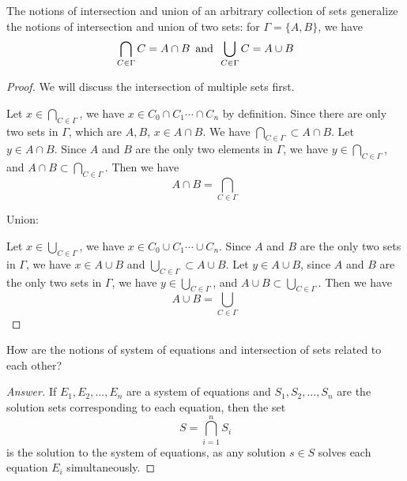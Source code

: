 \begin{majorEx}%
    The notions of intersection and union of an arbitrary collection of sets
    generalize the notions of intersection and union of two sets: for $\Gamma =
    \{A, B\}$, we have 
    $$
    \bigcap_{C \in \Gamma} C = A \cap B \hspace{5pt} \text{\normalfont and}
    \hspace{5pt} \bigcup_{C \in \Gamma} C = A \cup B
    $$
\end{majorEx}

\begin{proof}

    We will discuss the intersection of multiple sets first.

    Let $x \in \bigcap_{C \in \Gamma}$, we have $x \in C_0 \cap C_1 \cdots \cap
    C_n$ by definition. Since there are only two sets in $\Gamma$, which are $A,
    B$, $x \in A \cap B$. We have $\bigcap_{C \in \Gamma} \subset A \cap B$. Let
    $y \in A \cap B$. Since $A$ and $B$ are the only two elements in $\Gamma$,
    we have $y \in \bigcap_{C \in \Gamma}$, and $A \cap B \subset \bigcap_{C \in
    \Gamma}$. Then we have $$A \cap B = \bigcap_{C \in \Gamma}$$

    Union:

    Let $x \in \bigcup_{C \in \Gamma}$, we have $x \in C_0 \cup C_1 \cdots \cup
    C_n$. Since $A$ and $B$ are the only two sets in $\Gamma$, we have $x \in A
    \cup B$ and $\bigcup_{C \in \Gamma} \subset A \cup B$. Let $y \in A \cup B$,
    since $A$ and $B$ are the only two sets in $\Gamma$, we have $y \in
    \bigcup_{C \in \Gamma}$, and $A \cup B \subset \bigcup_{C \in \Gamma}$. Then
    we have $$A \cup B = \bigcup_{C \in \Gamma}$$
\end{proof}


\begin{minorEx}%
    [Riddle]
    How are the notions of system of equations and intersection of sets related
    to each other?
\end{minorEx}

\begin{proof}
    [Answer]
    If $E_1, E_2, \ldots, E_n$ are a system of equations and $S_1, S_2, \ldots,
    S_n$ are the solution sets corresponding to each equation, then the set
    \[
        S = \bigcap_{i=1}^{n} S_i
    \]
    is the solution to the system of equations, as any solution $s \in S$ solves
    each equation $E_i$ simultaneously.
\end{proof}

